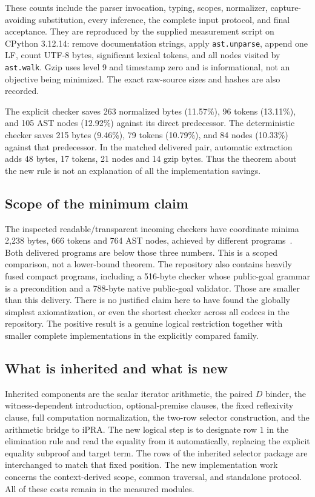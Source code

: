\documentclass[11pt,letterpaper]{article}
\theoremstyle{definition}\newtheorem{definition}[theorem]{Definition}
\theoremstyle{remark}\newtheorem{remark}[theorem]{Remark}
\begin{document}
These counts include the parser invocation, typing, scopes, normalizer,
capture-avoiding substitution, every inference, the complete input protocol,
and final acceptance. They are reproduced by the supplied measurement
script on CPython 3.12.14: remove documentation strings, apply
\texttt{ast.unparse}, append one LF, count UTF-8 bytes, significant lexical
tokens, and all nodes visited by \texttt{ast.walk}. Gzip uses level 9 and
timestamp zero and is informational, not an objective being minimized.
The exact raw-source sizes and hashes are also recorded.

The explicit checker saves 263 normalized bytes (11.57\%), 96 tokens
(13.11\%), and 105 AST nodes (12.92\%) against its direct predecessor.
The deterministic checker saves 215 bytes (9.46\%), 79 tokens (10.79\%),
and 84 nodes (10.33\%) against that predecessor. In the matched delivered
pair, automatic extraction adds 48 bytes, 17 tokens, 21 nodes and 14 gzip
bytes. Thus the theorem about the new rule is not an explanation of all
the implementation savings.

\subsection{Scope of the minimum claim}

The inspected readable/transparent incoming checkers have coordinate
minima 2,238 bytes, 666 tokens and 764 AST nodes, achieved by different
programs~\cite{binding,clauses}. Both delivered programs are below those
three numbers. This is a scoped comparison, not a lower-bound theorem.
The repository also contains heavily fused compact programs, including
a 516-byte checker whose public-goal grammar is a precondition and a
788-byte native public-goal validator. Those are smaller than this delivery.
There is no justified claim here to have found the globally simplest
axiomatization, or even the shortest checker across all codecs in the
repository. The positive result is a genuine logical restriction together
with smaller complete implementations in the explicitly compared family.

\subsection{What is inherited and what is new}

Inherited components are the scalar iterator arithmetic, the paired
$D$ binder, the witness-dependent introduction, optional-premise clauses,
the fixed reflexivity clause, full computation normalization, the two-row
selector construction, and the arithmetic bridge to iPRA. The new logical
step is to designate row $1$ in the elimination rule and read the equality
from it automatically, replacing the explicit equality subproof and target
term. The rows of the inherited selector package are interchanged to match
that fixed position. The new implementation work concerns the context-derived
scope, common traversal, and standalone protocol. All of these costs remain
in the measured modules.
\end{document}
